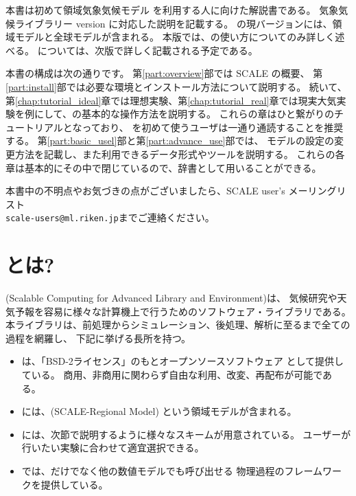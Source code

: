 

本書は初めて領域気象気候モデル {\scalerm}
を利用する人に向けた解説書である。
気象気候ライブラリー{\scalelib}  version \version に対応した説明を記載する。
\scalelib の現バージョンには、領域モデル\scalerm と全球モデル\scalegm が含まれる。
本版では、\scalerm の使い方についてのみ詳しく述べる。
\scalegm については、次版で詳しく記載される予定である。

本書の構成は次の通りです。
第\ref{part:overview}部では SCALE の概要、
第\ref{part:install}部では必要な環境とインストール方法について説明する。
続いて、第\ref{chap:tutorial_ideal}章では理想実験、第\ref{chap:tutorial_real}章では現実大気実験を例にして、\scalerm の基本的な操作方法を説明する。
これらの章はひと繋がりのチュートリアルとなっており、
\scalerm を初めて使うユーザは一通り通読することを推奨する。
第\ref{part:basic_usel}部と第\ref{part:advance_use}部では、
モデルの設定の変更方法を記載し、また利用できるデータ形式やツールを説明する。
これらの各章は基本的にその中で閉じているので、辞書として用いることができる。

本書中の不明点やお気づきの点がございましたら、SCALE user's メーリングリスト\\
 \verb|scale-users@ml.riken.jp|までご連絡ください。



\section{\scalelib とは?} \label{subsec:scale_feature}

{\scalelib} (Scalable Computing for Advanced Library and Environment)は、
気候研究や天気予報を容易に様々な計算機上で行うためのソフトウェア・ライブラリである。
本ライブラリは、前処理からシミュレーション、後処理、解析に至るまで全ての過程を網羅し、
下記に挙げる長所を持つ。
\begin{itemize}
\item \scalelib は、「BSD-2ライセンス」のもとオープンソースソフトウェア
として提供している。
商用、非商用に関わらず自由な利用、改変、再配布が可能である。
\item \scalelib には、\scalerm (SCALE-Regional Model)
という領域モデルが含まれる。
\item \scalelib には、次節で説明するように様々なスキームが用意されている。
ユーザーが行いたい実験に合わせて適宜選択できる。
\item \scalelib では、\scalerm だけでなく他の数値モデルでも呼び出せる
物理過程のフレームワークを提供している。
\end{itemize}

